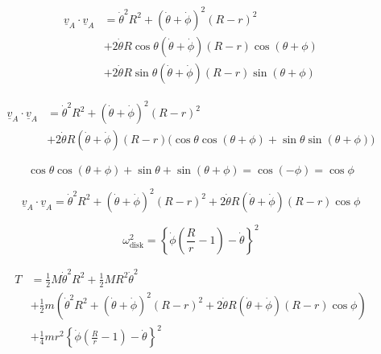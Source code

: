 \begin{equation*}
  \begin{split}
    \underline{v}_{A}\cdot\underline{v}_{A}
    &= \dot{\theta}^{2}R^{2}+(\dot{\theta}+\dot{\phi})^{2}(R-r)^{2} \\
    &+ 2\dot{\theta}R\cos\theta(\dot{\theta}+\dot{\phi})(R-r)\cos(\theta+\phi) \\
    &+ 2\dot{\theta}R\sin\theta(\dot{\theta}+\dot{\phi})(R-r)\sin(\theta+\phi)
  \end{split}
\end{equation*}

\begin{equation*}
  \begin{split}
    \underline{v}_{A}\cdot\underline{v}_{A}
    &= \dot{\theta}^{2}R^{2}+(\dot{\theta}+\dot{\phi})^{2}(R-r)^{2} \\
    &+ 2\dot{\theta}R(\dot{\theta}+\dot{\phi})(R-r)\bigr(\cos\theta\cos(\theta+\phi)+\sin\theta\sin(\theta+\phi)\bigr)
  \end{split}
\end{equation*}

\begin{equation*}
  \cos\theta\cos(\theta+\phi)+\sin\theta+\sin(\theta+\phi)=\cos(-\phi)=\cos\phi
\end{equation*}

\begin{equation*}
  \underline{v}_{A}\cdot\underline{v}_{A}
  = \dot{\theta}^{2}R^{2}+(\dot{\theta}+\dot{\phi})^{2}(R-r)^{2}+2\dot{\theta}R(\dot{\theta}+\dot{\phi})(R-r)\cos\phi
\end{equation*}

\begin{equation*}
  \omega_{\text{disk}}^{2}=\left\{\dot{\phi}\left(\frac{R}{r}-1\right)-\dot{\theta}\right\}^{2}
\end{equation*}

\begin{equation*}
  \begin{split}
    T
    &= \frac{1}{2}M\dot{\theta}^{2}R^{2}+\frac{1}{2}MR^{2}\dot{\theta}^{2} \\
    &+ \frac{1}{2}m\left(\dot{\theta}^{2}R^{2}+(\dot{\theta}+\dot{\phi})^{2}(R-r)^{2} + 2\dot{\theta}R(\dot{\theta}+\dot{\phi})(R-r)\cos\phi\right) \\
    &+ \frac{1}{4}mr^{2}\left\{\dot{\phi}\left(\frac{R}{r}-1\right)-\dot{\theta}\right\}^{2}
  \end{split}
\end{equation*}

